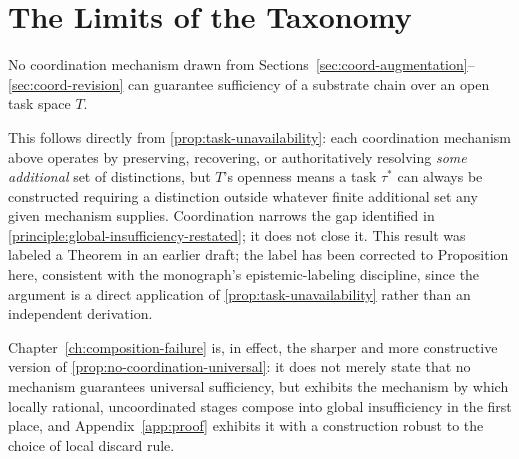 \section{The Limits of the Taxonomy}

\begin{proposition}
\label{prop:no-coordination-universal}
No coordination mechanism drawn from
Sections~\ref{sec:coord-augmentation}--\ref{sec:coord-revision} can
guarantee sufficiency of a substrate chain over an open task space $T$.
\end{proposition}

\begin{proofsketch}
This follows directly from \cref{prop:task-unavailability}: each
coordination mechanism above operates by preserving, recovering, or
authoritatively resolving \emph{some additional} set of distinctions, but
$T$'s openness means a task $\tau^*$ can always be constructed requiring a
distinction outside whatever finite additional set any given mechanism
supplies. Coordination narrows the gap identified in
\cref{principle:global-insufficiency-restated}; it does not close it. This
result was labeled a Theorem in an earlier draft; the label has been
corrected to Proposition here, consistent with the monograph's
epistemic-labeling discipline, since the argument is a direct application
of \cref{prop:task-unavailability} rather than an independent derivation.
\end{proofsketch}

Chapter~\ref{ch:composition-failure} is, in effect, the sharper and more
constructive version of \cref{prop:no-coordination-universal}: it does
not merely state that no mechanism guarantees universal sufficiency, but
exhibits the mechanism by which locally rational, uncoordinated stages
compose into global insufficiency in the first place, and
Appendix~\ref{app:proof} exhibits it with a construction robust to the
choice of local discard rule.
